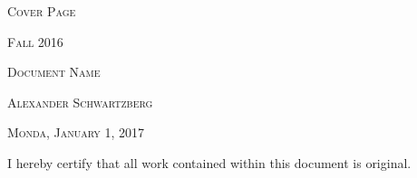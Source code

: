 \begin{titlepage}
  \centering

  {\scshape\LARGE Cover Page \par}
  \vspace{1cm}

  {\scshape\Large Fall 2016\par}
  \vspace{1cm}

  {\scshape\Large Document Name\par}
  \vspace{1.5cm}

  {\scshape\Large Alexander Schwartzberg\par}
  \vspace{1.5cm}

  {\scshape\Large Monda, January 1, 2017\par}

  \vfill
  I hereby certify that all work contained within this document is original.\par

  \vspace{1.5cm}


\end{titlepage}
